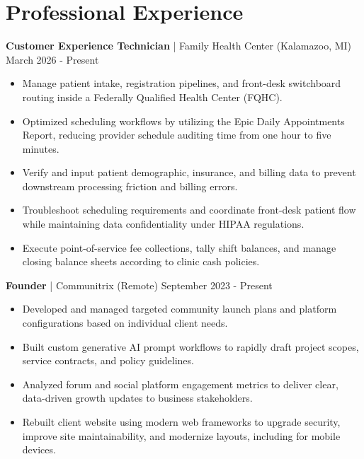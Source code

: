 \documentclass[10pt,letterpaper]{article}
\begin{document}
\section{Professional Experience}

\textbf{Customer Experience Technician} | Family Health Center (Kalamazoo, MI) \hfill March 2026 - Present
\begin{itemize}
    \item Manage patient intake, registration pipelines, and front-desk switchboard routing inside a Federally Qualified Health Center (FQHC).
    \item Optimized scheduling workflows by utilizing the Epic Daily Appointments Report, reducing provider schedule auditing time from one hour to five minutes.
    \item Verify and input patient demographic, insurance, and billing data to prevent downstream processing friction and billing errors.
    \item Troubleshoot scheduling requirements and coordinate front-desk patient flow while maintaining data confidentiality under HIPAA regulations.
    \item Execute point-of-service fee collections, tally shift balances, and manage closing balance sheets according to clinic cash policies.
\end{itemize}

\textbf{Founder} | Communitrix (Remote) \hfill September 2023 - Present
\begin{itemize}
    \item Developed and managed targeted community launch plans and platform configurations based on individual client needs.
    \item Built custom generative AI prompt workflows to rapidly draft project scopes, service contracts, and policy guidelines.
    \item Analyzed forum and social platform engagement metrics to deliver clear, data-driven growth updates to business stakeholders.
    \item Rebuilt client website using modern web frameworks to upgrade security, improve site maintainability, and modernize layouts, including for mobile devices.
\end{itemize}
\end{document}

